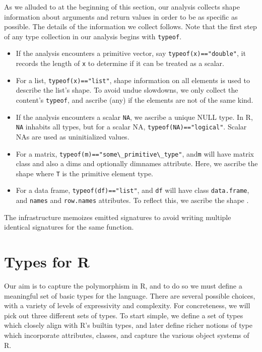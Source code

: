 \documentclass[acmsmall,10pt,review,anonymous]{acmart}\settopmatter{printfolios=true,printccs=false,printacmref=false}
\newcommand{\code}[1]{\lstinline|#1|\xspace}
\begin{document}
As we alluded to at the beginning of this section, our analysis collects shape information about
arguments and return values in order to be as specific as possible. The details of the information we collect follows.
Note that the first step of any type collection in our analysis begins with \code{typeof}.

\begin{itemize}
\item If the analysis encounters a primitive vector, say
  \code{typeof(x)=="double"}, it records the length of {\tt x} to determine
  if it can be treated as a scalar.
\item For a list, \code{typeof(x)=="list"}, shape information on all
  elements is used to describe the list's shape.  To avoid undue slowdowns,
  we only collect the content's \code{typeof}, and ascribe \ANY (any) if the
  elements are not of the same kind.
\item If the analysis encounters a scalar \code{NA}, we ascribe a unique
  NULL type.  In R, \code{NA} inhabits all types, but for a scalar NA,
  \code{typeof(NA)=="logical"}. Scalar NAs are used as uninitialized values.
\item For a matrix, \code{typeof(m)=="some\_primitive\_type"}, and\code{m} will have matrix class and also a dims and
  optionally dimnames attribute. Here, we ascribe the shape 
  where {\tt T} is the primitive element type.
\item For a data frame, \code{typeof(df)=="list"}, and \code{df} will have class {\tt data.frame}, and {\tt names} and {\tt row.names} attributes.
 To reflect this, we ascribe the shape .
\end{itemize}

The infrastructure memoizes emitted signatures to avoid writing multiple
identical signatures for the same function.

\section{Types for R}

Our aim is to capture the polymorphism in R, and to do so we must define a meaningful set of basic types for the language.
There are several possible choices, with a variety of levels of expressivity and complexity.
For concreteness, we will pick out three different sets of types.
To start simple, we define a set of types which closely align with R's builtin types, and later define richer notions of type which incorporate attributes, classes, and capture the various object systems of R.
\end{document}
